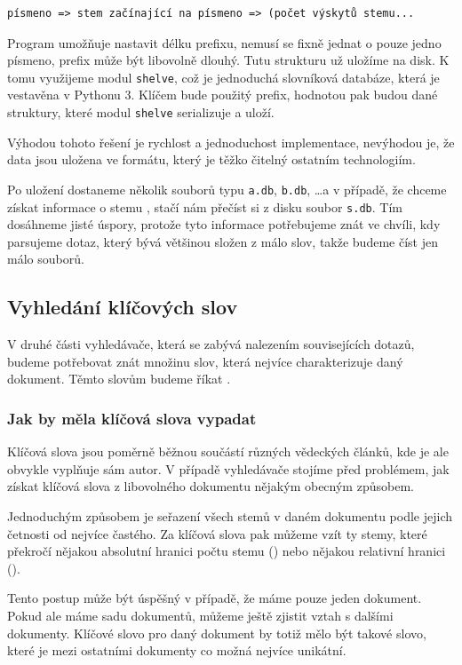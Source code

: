\documentclass[12pt]{article}
\newcommand{\code}[1]{\texttt{#1}}
\begin{document}
\begin{verbatim}
písmeno => stem začínající na písmeno => (počet výskytů stemu...
\end{verbatim}

Program umožňuje nastavit délku prefixu, nemusí se fixně jednat o pouze jedno písmeno, prefix může být libovolně dlouhý. Tutu strukturu už uložíme na disk. K tomu využijeme modul \code{shelve}, což je jednoduchá slovníková databáze, která je vestavěna v Pythonu 3. Klíčem bude použitý prefix, hodnotou pak budou dané struktury, které modul \code{shelve} serializuje a uloží. 

Výhodou tohoto řešení je rychlost a jednoduchost implementace, nevýhodou je, že data jsou uložena ve formátu, který je těžko čitelný ostatním technologiím. 

Po uložení dostaneme několik souborů typu \code{a.db}, \code{b.db}, \dots a v případě, že chceme získat informace o stemu , stačí nám přečíst si z disku soubor \code{s.db}. Tím dosáhneme jisté úspory, protože tyto informace potřebujeme znát ve chvíli, kdy parsujeme dotaz, který bývá většinou složen z málo slov, takže budeme číst jen málo souborů. 

\subsection{Vyhledání klíčových slov} 

V druhé části vyhledávače, která se zabývá nalezením souvisejících dotazů, budeme potřebovat znát množinu slov, která nejvíce charakterizuje daný dokument. Těmto slovům budeme říkat . 

\subsubsection{Jak by měla klíčová slova vypadat}

Klíčová slova jsou poměrně běžnou součástí různých vědeckých článků, kde je ale obvykle vyplňuje sám autor. V případě vyhledávače stojíme před problémem, jak získat klíčová slova z libovolného dokumentu nějakým obecným způsobem. 

Jednoduchým způsobem je seřazení všech stemů v daném dokumentu podle jejich četnosti od nejvíce častého. Za klíčová slova pak můžeme vzít ty stemy, které překročí nějakou absolutní hranici počtu stemu () nebo nějakou relativní hranici (). 

Tento postup může být úspěšný v případě, že máme pouze jeden dokument. Pokud ale máme sadu dokumentů, můžeme ještě zjistit vztah s dalšími dokumenty. Klíčové slovo pro daný dokument by totiž mělo být takové slovo, které je mezi ostatními dokumenty co možná nejvíce unikátní. 
\end{document}
